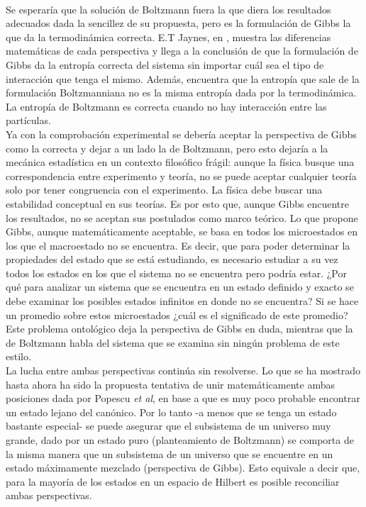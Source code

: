 \\
Se esperaría que la solución de Boltzmann fuera la que diera los resultados adecuados dada la sencillez de su propuesta, pero es la formulación de Gibbs la que da la termodinámica correcta. E.T Jaynes, en \cite{JaynesEntropies}, muestra las diferencias matemáticas de cada perspectiva y llega a la conclusión de que la formulación de Gibbs da la entropía correcta del sistema sin importar cuál sea el tipo de interacción que tenga el mismo. Además, encuentra que la entropía que sale de la formulación Boltzmanniana no es la misma entropía dada por la termodinámica. La entropía de Boltzmann es correcta cuando no hay interacción entre las partículas.
\\
Ya con la comprobación experimental se debería aceptar la perspectiva de Gibbs como la correcta y dejar a un lado la de Boltzmann, pero esto dejaría a la mecánica estadística en un contexto filosófico frágil: aunque la física busque una correspondencia entre experimento y teoría, no se puede aceptar cualquier teoría solo por tener congruencia con el experimento. La física debe buscar una estabilidad conceptual en sus teorías. Es por esto que, aunque Gibbs encuentre los resultados, no se aceptan sus postulados como marco teórico. Lo que propone Gibbs, aunque matemáticamente aceptable, se basa en todos los microestados en los que el macroestado no se encuentra. Es decir, que para poder determinar la propiedades del estado que se está estudiando, es necesario estudiar a su vez todos los estados en los que el sistema no se encuentra pero podría estar. ¿Por qué para analizar un sistema que se encuentra en un estado definido y exacto se debe examinar los posibles estados infinitos en donde no se encuentra? Si se hace un promedio sobre estos microestados ¿cuál es el significado de este promedio? Este problema ontológico deja la perspectiva de Gibbs en duda, mientras que la de Boltzmann habla del sistema que se examina sin ningún problema de este estilo. 
\\
La lucha entre ambas perspectivas continúa sin resolverse. Lo que se ha mostrado hasta ahora ha sido la propuesta tentativa de unir matemáticamente ambas posiciones dada por Popescu \textit{et al}, en base a que es muy poco probable encontrar un estado lejano del canónico. Por lo tanto -a menos que se tenga un estado bastante especial- se puede asegurar que el subsistema de un universo muy grande, dado por un estado puro (planteamiento de Boltzmann) se comporta de la misma manera que un subsistema de un universo que se encuentre en un estado máximamente mezclado (perspectiva de Gibbs). Esto equivale a decir que, para la mayoría de los estados en un espacio de Hilbert es posible reconciliar ambas perspectivas.
